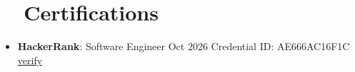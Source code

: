 \documentclass[a4paper, 20pt]{article}
\newcommand{\resumeItem}[2]{ \item\small{ \textbf{#1}{: #2} } }
\newcommand{\resumeSubItem}[2]{\resumeItem{#1}{#2}
\vspace{-8pt}}
\newcommand{\resumeSubHeadingListStart}{\begin{itemize}[leftmargin=*,topsep=1pt]}
\newcommand{\resumeSubHeadingListEnd}{\end{itemize}}
\begin{document}
	\vspace{8pt}
	\section{~~Certifications}
	\resumeSubHeadingListStart \resumeSubItem{HackerRank}{Software Engineer \textbullet{} Oct 2026 \textbullet{} Credential ID: AE666AC16F1C \textbullet{} \href{https://www.hackerrank.com/certificates/e4382188f72a}{verify}}
	\resumeSubHeadingListEnd
\end{document}
